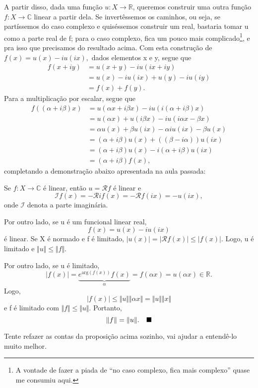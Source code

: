 \documentclass[../functional_analysis.tex]{subfiles}
\begin{document}
A partir disso, dada uma função \(u:X\rightarrow \mathbb{R}\), queremos construir uma outra função \(f:X\rightarrow \mathbb{C}\) linear a partir dela. Se invertêssemos os caminhos, ou seja, se partíssemos do caso complexo e quiséssemos construir um real, bastaria tomar u como a parte real de f; para o caso complexo, fica um pouco mais complicado\footnote{A vontade de fazer a piada de ``no caso complexo, fica mais complexo'' quase me consumiu aqui.}, e pra isso que precisamos do resultado acima. Com esta construção de \(f(x) = u(x) - iu(ix),\) dados elementos x e y, segue que
\begin{align*}
	f(x+iy) & = u(x+y) - iu(ix+iy)          \\
	        & = u(x) - iu(ix) + u(y)-iu(iy) \\
	        & = f(x) + f(y).
\end{align*}
Para a multiplicação por escalar, segue que
\begin{align*}
	f((\alpha +i\beta )x) & = u(\alpha x + i\beta x) - i u(i(\alpha +i\beta )x)       \\
	                      & = u(\alpha x)+u(i\beta x) - i u(i\alpha x - \beta x)      \\
	                      & = \alpha u(x) + \beta u(ix) - \alpha i u(ix) - \beta u(x) \\
	                      & = (\alpha +i\beta)u(x) + ((\beta - i \alpha ))u(ix)       \\
	                      & = (\alpha + i\beta )u(x) - i(\alpha +i\beta )u(ix)        \\
	                      & = (\alpha +i\beta )f(x),
\end{align*}
completando a demonstração abaixo apresentada na aula passada:

\begin{proof*}
	Se \(f:X\rightarrow \mathbb{C}\) é linear, então \(u=\mathcal{R}f\) é linear e
	\[
		\mathcal{I}f(x)=-\mathcal{R}if(x)=-\mathcal{R}f(ix)=-u(ix),
	\]
	onde \(\mathcal{I}\) denota a parte imaginária.

	Por outro lado, se u é um funcional linear real,
	\[
		f(x)=u(x)-iu(ix)
	\]
	é linear. Se X é normado e f é limitado, \(|u(x)|=|\mathcal{R}f(x)|\leq |f(x)|.\) Logo, u é limitado e \(\Vert u \Vert\leq \Vert f \Vert.\)

	Por outro lado, se u é limitado,
	\[
		|f(x)|=\underbrace{e^{\mathrm{arg}(f(x))}f(x)}_{\alpha }=f(\alpha x)=u(\alpha x)\in \mathbb{R}.
	\]
	Logo,
	\[
		|f(x)|\leq \Vert u \Vert \Vert \alpha x \Vert = \Vert u \Vert \Vert x \Vert
	\]
	e f é limitado com \(\Vert f \Vert\leq \Vert u \Vert.\) Portanto,
	\[
		\Vert f \Vert=\Vert u \Vert.\quad \text{$\blacksquare$}
	\]
\end{proof*}
\begin{exr}
	Tente refazer as contas da proposição acima sozinho, vai ajudar a entendê-lo muito melhor.
\end{exr}
\end{document}
